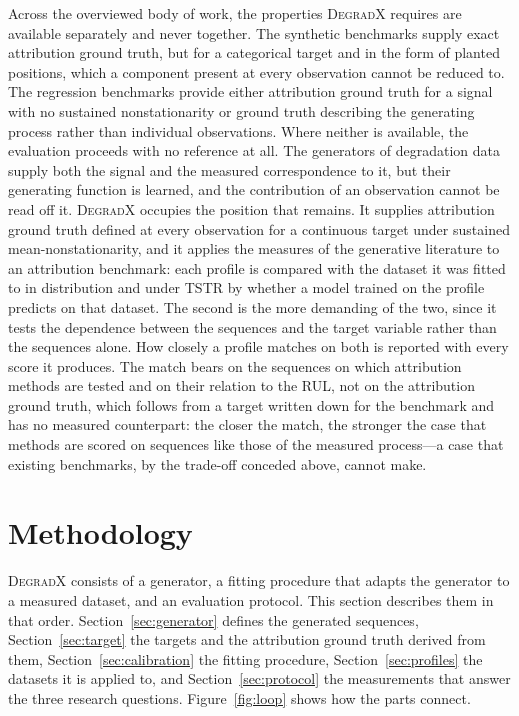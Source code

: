 \documentclass{article}
\newif\ifreview \reviewtrue        %
\newcommand{\rev}[1]{\ifreview\textcolor[HTML]{0B5FA5}{#1}\else#1\fi}
\newcommand{\revwhy}[1]{\ifreview\marginpar{\footnotesize\raggedright\textcolor[HTML]{0B5FA5}{#1}}\fi}
\begin{document}
Across the overviewed body of work, the properties \textsc{DegradX} requires are available separately and never together. The synthetic benchmarks supply exact attribution ground truth, but for a categorical target and in the form of planted positions, which a component present at every observation cannot be reduced to. The regression benchmarks provide either attribution ground truth for a signal with no sustained nonstationarity or ground truth describing the generating process rather than individual observations. Where neither is available, the evaluation proceeds with no reference at all. The generators of degradation data supply both the signal and the measured correspondence to it, but their generating function is learned, and the contribution of an observation cannot be read off it. \textsc{DegradX} occupies the position that remains. It supplies attribution ground truth defined at every observation for a continuous target under sustained mean-nonstationarity, and it applies the measures of the generative literature to an attribution benchmark: each profile is compared with the dataset it was fitted to in distribution and under TSTR by whether a model trained on the profile predicts on that dataset. The second is the more demanding of the two, since it tests the dependence between the sequences and the target variable rather than the sequences alone. How closely a profile matches on both is reported with every score it produces. \rev{The match bears on the sequences on which attribution methods are tested and on their relation to the RUL, not on the attribution ground truth, which follows from a target written down for the benchmark and has no measured counterpart: the closer the match, the stronger the case that methods are scored on sequences like those of the measured process}—a case that existing benchmarks, by the trade-off conceded above, cannot make.\revwhy{FIX-2: fidelity bears on the sequences, not on $\phi^{\star}$}


\section{Methodology}
 
\textsc{DegradX} consists of a generator, a fitting procedure that adapts the generator to a measured dataset, and an evaluation protocol. This section describes them in that order. Section~\ref{sec:generator} defines the generated sequences, Section~\ref{sec:target} the targets and the attribution ground truth derived from them, Section~\ref{sec:calibration} the fitting procedure, Section~\ref{sec:profiles} the datasets it is applied to, and Section~\ref{sec:protocol} the measurements that answer the three research questions. Figure~\ref{fig:loop} shows how the parts connect.
 
\end{document}

